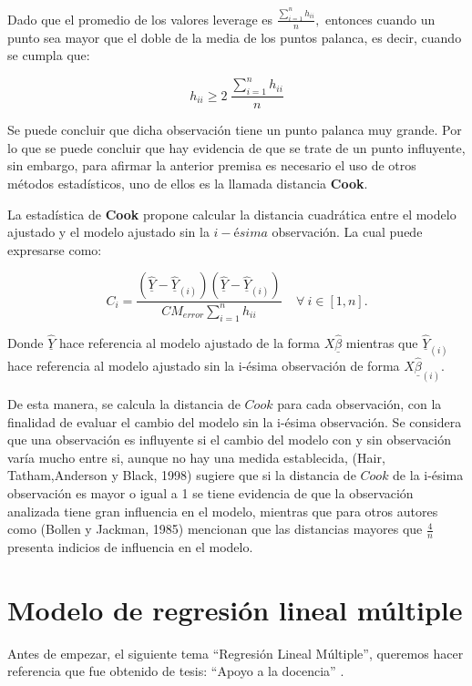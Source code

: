 \documentclass[
  a4paper,
  oneside,
  openany]{book}
\begin{document}
Dado que el promedio de los valores leverage es \(\frac{\sum_{i=1}^{n}h_{ii}}{n},\) entonces cuando un punto sea mayor que el doble de la media de los puntos palanca, es decir, cuando se cumpla que:

\[h_{ii} \geq  2 \ \frac{\sum_{i=1}^{n}h_{ii}}{n}\]

Se puede concluir que dicha observación tiene un punto palanca muy grande. Por lo que se puede concluir que hay evidencia de que se trate de un punto influyente, sin embargo, para afirmar la anterior premisa es necesario el uso de otros métodos estadísticos, uno de ellos es la llamada distancia \textbf{Cook}.

La estadística de \textbf{Cook} propone calcular la distancia cuadrática entre el modelo ajustado y el modelo ajustado sin la \(i-ésima\) observación. La cual puede expresarse como:

\[C_{i}=\frac{\left(\underline{\hat{Y}}-\underline{\hat{Y}}_{(i)}\right)\left(\underline{\hat{Y}}-\underline{\hat{Y}}_{(i)}\right)}{CM_{error}\sum_{i=1}^{n}h_{ii}} \ \ \ \ \  \forall \ i \in [1,n].\]

Donde \(\underline{\hat{Y}}\) hace referencia al modelo ajustado de la forma \(X\underline{\hat{\beta}}\) mientras que \(\underline{\hat{Y}}_{(i)}\) hace referencia al modelo ajustado sin la i-ésima observación de forma \(X\underline{\hat{\beta}}_{(i)}\).

De esta manera, se calcula la distancia de \(Cook\) para cada observación, con la finalidad de evaluar el cambio del modelo sin la i-ésima observación. Se considera que una observación es influyente si el cambio del modelo con y sin observación varía mucho entre si, aunque no hay una medida establecida, (Hair, Tatham,Anderson y Black, 1998) sugiere que si la distancia de \(Cook\) de la i-ésima observación es mayor o igual a 1 se tiene evidencia de que la observación analizada tiene gran influencia en el modelo, mientras que para otros autores como (Bollen y Jackman, 1985) mencionan que las distancias mayores que \(\frac{4}{n}\) presenta indicios de influencia en el modelo.

\hypertarget{modelo-de-regresiuxf3n-lineal-muxfaltiple}{%
\chapter{Modelo de regresión lineal múltiple}\label{modelo-de-regresiuxf3n-lineal-muxfaltiple}}

Antes de empezar, el siguiente tema ``Regresión Lineal Múltiple'', queremos hacer referencia que fue obtenido de tesis: ``Apoyo a la docencia'' \citet{Tesisdelicenciatura2019Estadistica}.
\end{document}
